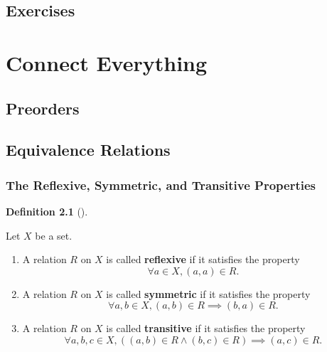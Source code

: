 \documentclass[
  letterpaper,
  10pt,
  reqno,
  twopage,
  openany]{book}
\providecommand{\tightlist}{%
  \setlength{\itemsep}{0pt}\setlength{\parskip}{0pt}}\usepackage{longtable,booktabs,array}
\theoremstyle{plain}
\theoremstyle{definition}
\theoremstyle{definition}
\newtheorem{definition}{Definition}[chapter]
\theoremstyle{definition}
\theoremstyle{plain}
\theoremstyle{plain}
\theoremstyle{remark}
\begin{document}
\hypertarget{exercises-5}{%
\section{Exercises}\label{exercises-5}}


\hypertarget{connect-everything}{%
\chapter{Connect Everything}\label{connect-everything}}

\hypertarget{preorders}{%
\section{Preorders}\label{preorders}}

\hypertarget{equivalence-relations}{%
\section{Equivalence Relations}\label{equivalence-relations}}

\hypertarget{the-reflexive-symmetric-and-transitive-properties}{%
\subsection{The Reflexive, Symmetric, and Transitive
Properties}\label{the-reflexive-symmetric-and-transitive-properties}}

\leavevmode{}%
\begin{definition}[]\label{def-reflexive-symmetric-transitive}

Let \(X\) be a set.

\begin{enumerate}
\def\labelenumi{\arabic{enumi}.}
\tightlist
\item
  A relation \(R\) on \(X\) is called 
  \textbf{reflexive} if it satisfies the property
  \[\forall a\in X, (a,a)\in R.\]
\item
  A relation \(R\) on \(X\) is called 
  \textbf{symmetric} if it satisfies the property
  \[ \forall a,b \in X, (a,b)\in R \implies (b,a)\in R. \]
\item
  A relation \(R\) on \(X\) is called 
  \textbf{transitive} if it satisfies the property
  \[\forall a,b,c\in X, ((a,b)\in R \land (b,c)\in R) \implies (a,c)\in R.\]
\end{enumerate}

\end{definition}
\end{document}

